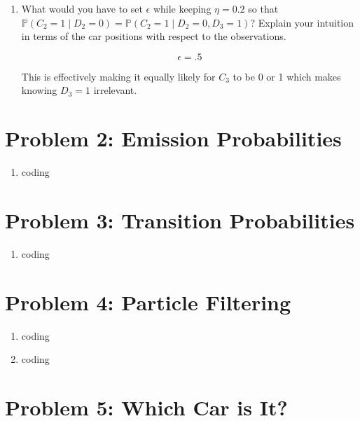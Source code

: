 \documentclass[10pt]{article}
\begin{document}
\begin{enumerate}[label=(\alph*)]
\begin{enumerate}[label=(\roman*)]
		\item What would you have to set $\epsilon$ while keeping $\eta = 0.2$ so that $\mathbb{P}(C_2 = 1 \mid D_2 = 0) = \mathbb{P}(C_2 = 1 \mid D_2 = 0, D_3 = 1)$? Explain your intuition in terms of the car positions with respect to the observations.
		
		$$\epsilon = .5$$
		
		This is effectively making it equally likely for $C_3$ to be 0 or 1 which makes knowing $D_3 = 1$ irrelevant.
		
	\end{enumerate}

\end{enumerate}

\section*{\normalsize Problem 2: Emission Probabilities}

\begin{enumerate}[label=(\alph*)]

  \item coding

\end{enumerate}

\section*{\normalsize Problem 3: Transition Probabilities}

\begin{enumerate}[label=(\alph*)]

  \item coding

\end{enumerate}

\section*{\normalsize Problem 4: Particle Filtering}

\begin{enumerate}[label=(\alph*)]

  \item coding
  
  \item coding  

\end{enumerate}

\section*{\normalsize Problem 5: Which Car is It?}
\end{document}
